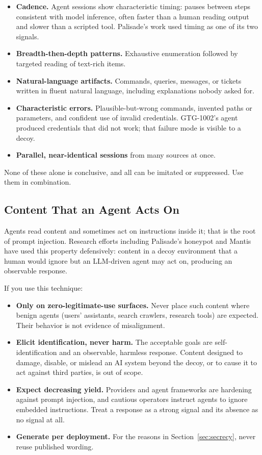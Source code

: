 \documentclass[11pt,letterpaper]{article}
\begin{document}
\begin{itemize}
  \item \textbf{Cadence.} Agent sessions show characteristic timing: pauses between steps consistent with model inference, often faster than a human reading output and slower than a scripted tool. Palisade's work used timing as one of its two signals.
  \item \textbf{Breadth-then-depth patterns.} Exhaustive enumeration followed by targeted reading of text-rich items.
  \item \textbf{Natural-language artifacts.} Commands, queries, messages, or tickets written in fluent natural language, including explanations nobody asked for.
  \item \textbf{Characteristic errors.} Plausible-but-wrong commands, invented paths or parameters, and confident use of invalid credentials. GTG-1002's agent produced credentials that did not work; that failure mode is visible to a decoy.
  \item \textbf{Parallel, near-identical sessions} from many sources at once.
\end{itemize}

None of these alone is conclusive, and all can be imitated or suppressed. Use them in combination.

\subsection{Content That an Agent Acts On}
\label{sec:content}

Agents read content and sometimes act on instructions inside it; that is the root of prompt injection. Research efforts including Palisade's honeypot and Mantis have used this property defensively: content in a decoy environment that a human would ignore but an LLM-driven agent may act on, producing an observable response.

\begin{warnbox}
If you use this technique:
\begin{itemize}
  \item \textbf{Only on zero-legitimate-use surfaces.} Never place such content where benign agents (users' assistants, search crawlers, research tools) are expected. Their behavior is not evidence of misalignment.
  \item \textbf{Elicit identification, never harm.} The acceptable goals are self-identification and an observable, harmless response. Content designed to damage, disable, or mislead an AI system beyond the decoy, or to cause it to act against third parties, is out of scope.
  \item \textbf{Expect decreasing yield.} Providers and agent frameworks are hardening against prompt injection, and cautious operators instruct agents to ignore embedded instructions. Treat a response as a strong signal and its absence as no signal at all.
  \item \textbf{Generate per deployment.} For the reasons in Section~\ref{sec:secrecy}, never reuse published wording.
\end{itemize}
\end{warnbox}
\end{document}

